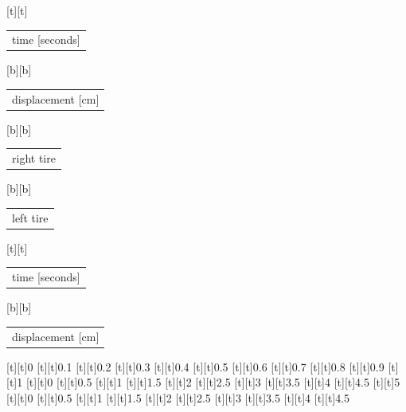 %    
%
%
\begin{psfrags}%
\psfragscanon%
%
[t][t]{\color[rgb]{0,0,0}\setlength{\tabcolsep}{0pt}\begin{tabular}{c}time [seconds]\end{tabular}}%
[b][b]{\color[rgb]{0,0,0}\setlength{\tabcolsep}{0pt}\begin{tabular}{c}displacement [cm]\end{tabular}}%
[b][b]{\color[rgb]{0,0,0}\setlength{\tabcolsep}{0pt}\begin{tabular}{c}right tire\end{tabular}}%
[b][b]{\color[rgb]{0,0,0}\setlength{\tabcolsep}{0pt}\begin{tabular}{c}left tire\end{tabular}}%
[t][t]{\color[rgb]{0,0,0}\setlength{\tabcolsep}{0pt}\begin{tabular}{c}time [seconds]\end{tabular}}%
[b][b]{\color[rgb]{0,0,0}\setlength{\tabcolsep}{0pt}\begin{tabular}{c}displacement [cm]\end{tabular}}%
%
[t][t]{0}%
[t][t]{0.1}%
[t][t]{0.2}%
[t][t]{0.3}%
[t][t]{0.4}%
[t][t]{0.5}%
[t][t]{0.6}%
[t][t]{0.7}%
[t][t]{0.8}%
[t][t]{0.9}%
[t][t]{1}%
[t][t]{0}%
[t][t]{0.5}%
[t][t]{1}%
[t][t]{1.5}%
[t][t]{2}%
[t][t]{2.5}%
[t][t]{3}%
[t][t]{3.5}%
[t][t]{4}%
[t][t]{4.5}%
[t][t]{5}%
[t][t]{0}%
[t][t]{0.5}%
[t][t]{1}%
[t][t]{1.5}%
[t][t]{2}%
[t][t]{2.5}%
[t][t]{3}%
[t][t]{3.5}%
[t][t]{4}%
[t][t]{4.5}%

\end{psfrags}
